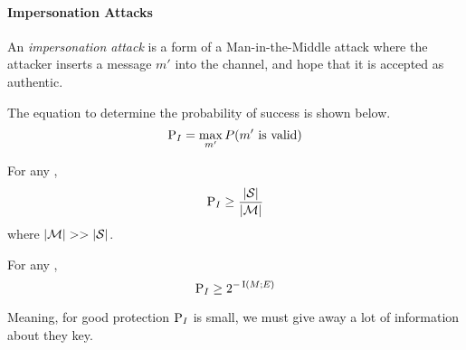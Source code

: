 \paragraph{Impersonation Attacks}\label{par:Attack_Authentication_Code-Impersonation}
\begin{definition}\label{def:Attack_Authentication_Code-Impersonation}
  An \emph{impersonation attack} is a form of a Man-in-the-Middle attack where the attacker inserts a message $m'$ into the channel, and hope that it is accepted as authentic.

  The equation to determine the probability of success is shown below.
  \begin{equation}\label{eq:Attack_Authentication_Code-Impersonation-Success}
    \operatorname{\operatorname{P}}_{I} = \max_{m'} P(m' \text{ is valid})
  \end{equation}
\end{definition}

\begin{theorem}\label{thm:Attack_Authentication_Code-Impersonation-Success_Bounds}
  For any ,
  \begin{equation}\label{eq:Attack_Authentication_Code-Impersonation-Success_Bound}
    \operatorname{\operatorname{P}}_{I} \geq \frac{\lvert \operatorname{\mathcal{S}} \rvert}{\lvert \operatorname{\mathcal{M}} \rvert}
  \end{equation}
  where $\lvert \operatorname{\mathcal{M}} \rvert >> \lvert \operatorname{\mathcal{S}} \rvert$.
\end{theorem}

\begin{theorem}\label{thm:Impersonation-Simmons_Bound}
  For any ,
  \begin{equation}\label{eq:Impersonation-Simmons_Bound}
    \operatorname{\operatorname{P}}_{I} \geq 2^{-\operatorname{\operatorname{I}}(M; E)}
  \end{equation}

  Meaning, for good protection $\operatorname{\operatorname{P}}_{I}$ is small, we must give away a lot of information about they key.
\end{theorem}


